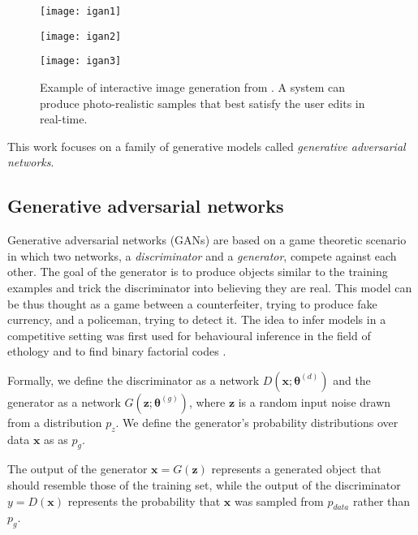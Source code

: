 \begin{figure}[ht]
    \centering
    \begin{minipage}{0.32\textwidth}
        \centering
        \texttt{[image: igan1]}
    \end{minipage}
    \begin{minipage}{0.32\textwidth}
        \centering
        \texttt{[image: igan2]}
    \end{minipage}
    \begin{minipage}{0.32\textwidth}
        \centering
        \texttt{[image: igan3]}
    \end{minipage}
    \caption{Example of interactive image generation from \cite{igan}. A system can produce photo-realistic samples that best satisfy the user edits in real-time.}
    \label{fig:art_on_demand}
\end{figure}


This work focuses on a family of generative models called \textit{generative adversarial networks}.


\subsection{Generative adversarial networks}



Generative adversarial networks (GANs) are based on a game theoretic scenario in which two networks, a \textit{discriminator} and a \textit{generator}, compete against each other. The goal of the generator is to produce objects similar to the training examples and trick the discriminator into believing they are real. This model can be thus thought as a game between a counterfeiter, trying to produce fake currency, and a policeman, trying to detect it. The idea to infer models in a competitive setting was first used for behavioural inference in the field of ethology \cite{controlled_interaction} and to find binary factorial codes \cite{factorial_codes}.

Formally, we define the discriminator as a network $D(\bm{x}; \bm{\theta}^{(d)})$ and the generator as a network $G(\bm{z}; \bm{\theta}^{(g)})$, where $\bm{z}$ is a random input noise drawn from a distribution $p_z$. We define the generator's probability distributions over data $\bm{x}$ as as $p_g$.

The output of the generator $\bm{x}=G(\bm{z})$ represents a generated object that should resemble those of the training set, while the output of the discriminator $y=D(\bm{x})$ represents the probability that $\bm{x}$ was sampled from $p_{data}$ rather than $p_g$.

